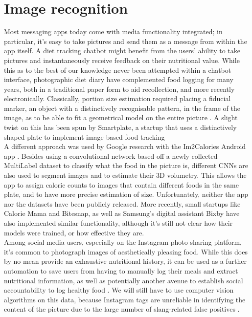 \section{Image recognition}
Most messaging apps today come with media functionality integrated; in particular, it's easy to take pictures and send them as a message from within the app itself. A diet tracking chatbot might benefit from the users' ability to take pictures and instantaneously receive feedback on their nutritional value. While this as to the best of our knowledge never been attempted within a chatbot interface, photographic diet diary have complemented food logging for many years, both in a traditional paper form to aid recollection\cite{}, and more recently electronically. Classically, portion size estimation required placing a fiducial marker, an object with a distinctively recognisable pattern, in the frame of the image, as to be able to fit a geometrical model on the entire picture \cite{Ahmad2016}. A slight twist on this has been spun by Smartplate, a startup that uses a distinctively shaped plate to implement image based food tracking \cite{} \\
A different approach was used by Google research with the Im2Calories Android app \cite{Myers2015}. Besides using a convolutional network based off a newly collected MultiLabel dataset to classify what the food in the picture is, different CNNs are also used to segment images and to estimate their 3D volumetry. This allows the app to assign calorie counts to images that contain different foods in the same plate, and to have more precise estimation of size. Unfortunately, neither the app nor the datasets have been publicly released. More recently, small startups like Calorie Mama\cite{caloriemamaai} and Bitesnap\cite{bitesnap}, as well as Samsung's digital assistant Bixby\cite{bixbyarticle} have also implemented similar functionality, although it's still not clear how their models were trained, or how effective they are. \\
Among social media users, especially on the Instagram photo sharing platform, it's common to photograph images of aesthetically pleasing food. While this does by no mean provide an exhaustive nutritional history, it can be used as a further automation to save users from having to manually log their meals and extract nutritional information, as well as potentially another avenue to establish social accountability to log healthy food \cite{Sharma:2015:MCN:2740908.2742754}. We will still have to use computer vision algorithms on this data, because Instagram tags are unreliable in identifying the content of the picture due to the large number of slang-related false positives \cite{hospedales2016}.

